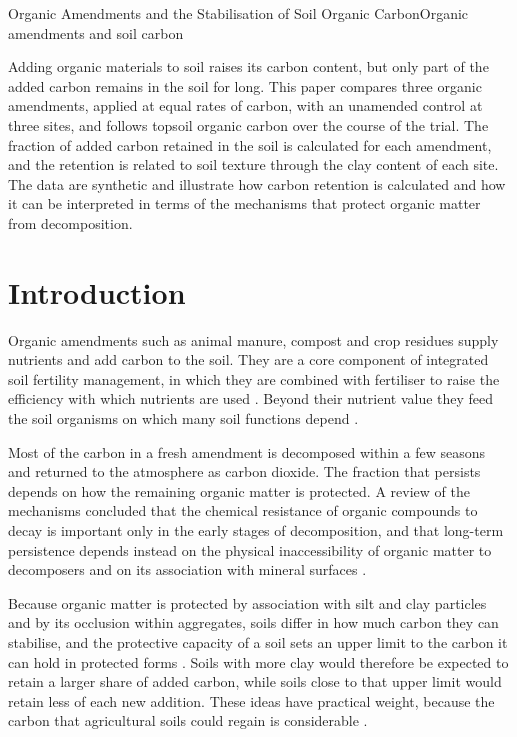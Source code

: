 \documentclass[../main.tex]{subfiles}
\begin{document}
\begin{paper}{Organic Amendments and the Stabilisation of Soil Organic Carbon}{Organic amendments and soil carbon}
\label{paper:amendments}

\begin{paperabstract}
Adding organic materials to soil raises its carbon content, but only part of
the added carbon remains in the soil for long. This paper compares three
organic amendments, applied at equal rates of carbon, with an unamended
control at three sites, and follows topsoil organic carbon over the course of
the trial. The fraction of added carbon retained in the soil is calculated
for each amendment, and the retention is related to soil texture through the
clay content of each site. The data are synthetic and illustrate how carbon
retention is calculated and how it can be interpreted in terms of the
mechanisms that protect organic matter from decomposition.
\end{paperabstract}

\section{Introduction}

Organic amendments such as animal manure, compost and crop residues supply
nutrients and add carbon to the soil. They are a core component of
integrated soil fertility management, in which they are combined with
fertiliser to raise the efficiency with which nutrients are used
\parencite{vanlauwe2010}. Beyond their nutrient value they feed the soil
organisms on which many soil functions depend \parencite{doran2000}.

Most of the carbon in a fresh amendment is decomposed within a few seasons
and returned to the atmosphere as carbon dioxide. The fraction that persists
depends on how the remaining organic matter is protected. A review of the
mechanisms concluded that the chemical resistance of organic compounds to
decay is important only in the early stages of decomposition, and that
long-term persistence depends instead on the physical inaccessibility of
organic matter to decomposers and on its association with mineral surfaces
\parencite{vonlutzow2006}.

Because organic matter is protected by association with silt and clay
particles and by its occlusion within aggregates, soils differ in how much
carbon they can stabilise, and the protective capacity of a soil sets an
upper limit to the carbon it can hold in protected forms \parencite{six2002}.
Soils with more clay would therefore be expected to retain a larger share of
added carbon, while soils close to that upper limit would retain less of each
new addition. These ideas have practical weight, because the carbon that
agricultural soils could regain is considerable \parencite{lal2004}.


\end{paper}
\end{document}
